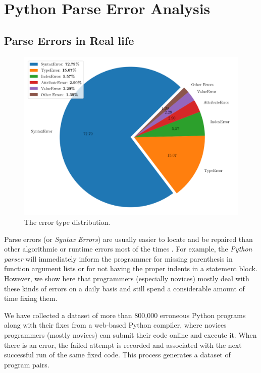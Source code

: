 \section{Python Parse Error Analysis}
\label{sec:error-analysis}

\subsection{Parse Errors in Real life}
\label{sec:error-analysis:syntax}

\begin{figure}[h]
  \centering
  \includegraphics[width=0.8\linewidth]{error-statistics.png}
  \caption{The error type distribution.}
  \label{fig:error-statistics}
\end{figure}

Parse errors (or \emph{Syntax Errors}) are usually easier to locate and be
repaired than other algorithmic or runtime errors most of the times \citep{?}.
For example, the \emph{Python parser} will immediately inform the programmer for
missing parenthesis in function argument lists or for not having the proper
indents in a statement block. However, we show here that programmers (especially
novices) mostly deal with these kinds of errors on a daily basis and still spend
a considerable amount of time fixing them.

We have collected a dataset of more than 800,000 erroneous Python programs along
with their fixes from a web-based Python compiler, where novices programmers
(mostly novices) can submit their code online and execute it. When there is an
error, the failed attempt is recorded and associated with the next successful
run of the same fixed code. This process generates a dataset of program pairs.

